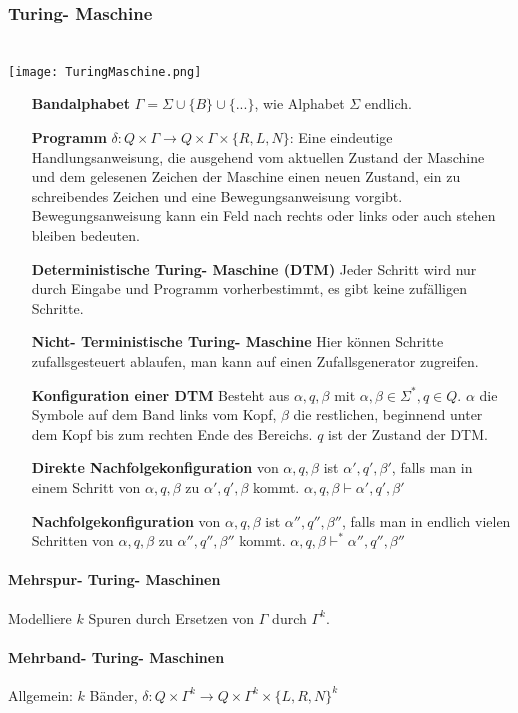 \documentclass[fleqn]{scrartcl}
\begin{document}
\subsubsection{Turing- Maschine}$ $\\
\texttt{[image: TuringMaschine.png]}
\begin{itemize}
\item[\textbf{Bandalphabet}] $\Gamma = \Sigma \cup \{B\} \cup \{...\}$, wie Alphabet $\Sigma$ endlich.
\item[\textbf{Programm}] $\delta : Q \times \Gamma \rightarrow Q \times \Gamma \times \{R, L, N\}$:
Eine eindeutige Handlungsanweisung, die ausgehend vom aktuellen Zustand der Maschine und dem gelesenen Zeichen der Maschine einen neuen Zustand, ein zu schreibendes Zeichen und eine Bewegungsanweisung vorgibt.
Bewegungsanweisung kann ein Feld nach rechts oder links oder auch stehen bleiben bedeuten.
\item[\textbf{Deterministische Turing- Maschine (DTM)}] Jeder Schritt wird nur durch Eingabe und Programm vorherbestimmt, es gibt keine zufälligen Schritte.
\item[\textbf{Nicht- Terministische Turing- Maschine}] Hier können Schritte zufallsgesteuert ablaufen, man kann \glqq auf einen Zufallsgenerator zugreifen\grqq.
\item[\textbf{Konfiguration einer DTM}] Besteht aus $\alpha, q, \beta$ mit $\alpha, \beta \in \Sigma^*, q \in Q$. $\alpha$  die Symbole auf dem Band links vom Kopf, $\beta$ die restlichen, beginnend unter dem Kopf bis zum rechten Ende des Bereichs. $q$ ist der Zustand der DTM.
\item[\textbf{Direkte Nachfolgekonfiguration}] von $\alpha, q, \beta$ ist $\alpha', q', \beta'$, falls man in einem Schritt von $\alpha, q, \beta$ zu $\alpha', q', \beta$ kommt. $\alpha, q, \beta \vdash \alpha', q', \beta'$
\item[\textbf{Nachfolgekonfiguration}] von $\alpha, q, \beta$ ist $\alpha'', q'', \beta''$, falls man in endlich vielen Schritten von $\alpha, q, \beta$ zu $\alpha'', q'', \beta''$ kommt. $\alpha, q, \beta \vdash^* \alpha'', q'', \beta''$
\end{itemize}

\paragraph{Mehrspur- Turing- Maschinen}
Modelliere $k$ Spuren durch Ersetzen von $\Gamma$ durch $\Gamma^k$.
\paragraph{Mehrband- Turing- Maschinen}
Allgemein: $k$ Bänder, $\delta: Q \times \Gamma^k \rightarrow Q \times \Gamma^k \times \{L, R, N\}^k$
\end{document}
